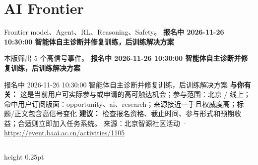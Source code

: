 \documentclass[10.5pt]{ctexart}
\begin{document}
\section*{AI Frontier}
{\color{ormuted} Frontier model、Agent、RL、Reasoning、Safety。}
\vspace{2mm}
{\LARGE\bfseries 报名中 2026-11-26 10:30:00 智能体自主诊断并修复训练，后训练解决方案}\par
\vspace{1mm}
{\color{ormuted} 本版筛出 5 个高信号事件。}
\vspace{3mm}
{\Large\bfseries 报名中 2026-11-26 10:30:00 智能体自主诊断并修复训练，后训练解决方案}\par
报名中 2026-11-26 10:30:00 智能体自主诊断并修复训练，后训练解决方案
\textbf{与你有关：} 这是当前用户可实际参与或申请的高可触达机会；参与范围：北京 / 线上；命中用户订阅版面：opportunity、ai、research；来源接近一手且权威度高；标题/正文包含高信号变化
\textbf{建议：} 检查报名资格、截止时间、参与形式和预期收益；合适则立即加入任务系统。
{\footnotesize\color{ormuted} 来源：北京智源社区活动 · \url{https://event.baai.ac.cn/activities/1105}}
\vspace{4mm}
\hrule height 0.25pt
\vspace{3mm}
\end{document}
